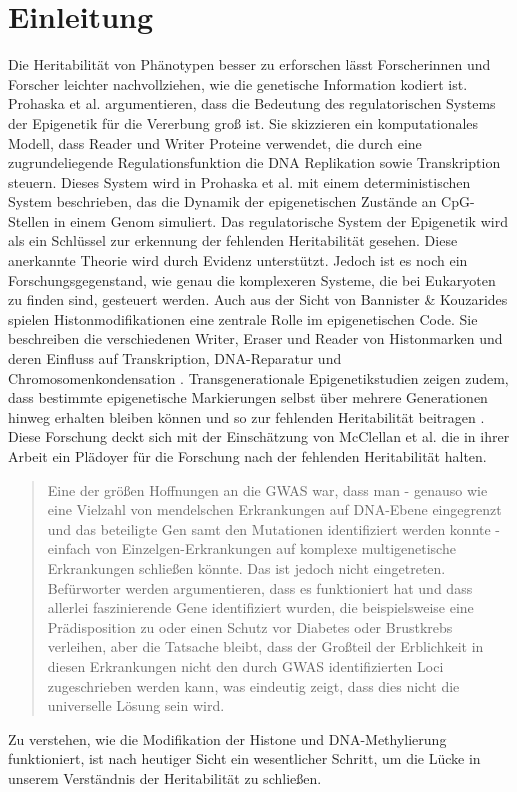 \documentclass{SeminarV2}
\begin{document}
\section{Einleitung}
Die Heritabilit\"{a}t von Ph\"{a}notypen besser zu erforschen l\"{a}sst Forscherinnen und Forscher leichter
nachvollziehen, wie die genetische Information kodiert ist.
Prohaska et al. argumentieren, dass die Bedeutung des regulatorischen Systems der Epigenetik f\"{u}r die Vererbung gro{\ss} ist.
Sie skizzieren ein komputationales Modell, dass Reader und Writer Proteine verwendet, die durch eine zugrundeliegende Regulationsfunktion die DNA Replikation sowie Transkription steuern.
Dieses System wird in Prohaska et al. mit einem deterministischen System beschrieben, das die Dynamik der epigenetischen Zust\"{a}nde an CpG-Stellen in einem Genom simuliert.
Das regulatorische System der Epigenetik wird als ein Schlüssel zur erkennung der fehlenden Heritabilität gesehen.
Diese anerkannte Theorie wird durch Evidenz unterstützt. Jedoch ist es noch ein Forschungsgegenstand, wie genau die komplexeren Systeme, die bei Eukaryoten zu finden sind, gesteuert werden. \cite{prohaska-2010}
Auch aus der Sicht von Bannister {\&} Kouzarides spielen Histonmodifikationen eine zentrale Rolle im epigenetischen Code. 
Sie beschreiben die verschiedenen Writer, Eraser und Reader von Histonmarken und deren Einfluss auf Transkription, DNA-Reparatur und Chromosomenkondensation \cite{bannister-2011}.  
Transgenerationale Epigenetikstudien zeigen zudem, dass bestimmte epigenetische Markierungen selbst \"{u}ber mehrere Generationen hinweg erhalten bleiben k\"{o}nnen und so zur fehlenden Heritabilit\"{a}t beitragen \cite{tollefsbol-2014}.
Diese Forschung deckt sich mit der Einschätzung von McClellan et al.
die in ihrer Arbeit ein Pl\"{a}doyer f\"{u}r die Forschung
nach der fehlenden Heritabilit\"{a}t halten.
\begin{quote}
  \sloppy
  Eine der gr\"{o}{\ss}en Hoffnungen an die GWAS war, dass man - 
  genauso wie eine Vielzahl von mendelschen Erkrankungen auf DNA-Ebene 
  eingegrenzt und das beteiligte Gen samt den Mutationen identifiziert werden konnte - 
  einfach von Einzelgen-Erkrankungen auf komplexe multigenetische Erkrankungen schlie{\ss}en k\"{o}nnte. 
  Das ist jedoch nicht eingetreten. Bef\"{u}rworter werden argumentieren, dass es funktioniert hat 
  und dass allerlei faszinierende Gene identifiziert wurden, die beispielsweise eine Pr\"{a}disposition 
  zu oder einen Schutz vor Diabetes oder Brustkrebs verleihen, aber die Tatsache bleibt, dass der Gro{\ss}teil 
  der Erblichkeit in diesen Erkrankungen nicht den durch GWAS identifizierten Loci zugeschrieben werden 
  kann, was eindeutig zeigt, dass dies nicht die universelle L\"{o}sung sein wird.
  \cite{mcclellan-2010}
\end{quote}
Zu verstehen, wie die Modifikation der Histone und DNA-Methylierung funktioniert, ist nach heutiger Sicht ein wesentlicher Schritt, um die L\"{u}cke in unserem Verst\"{a}ndnis der Heritabilit\"{a}t zu schlie{\ss}en.
\end{document}
